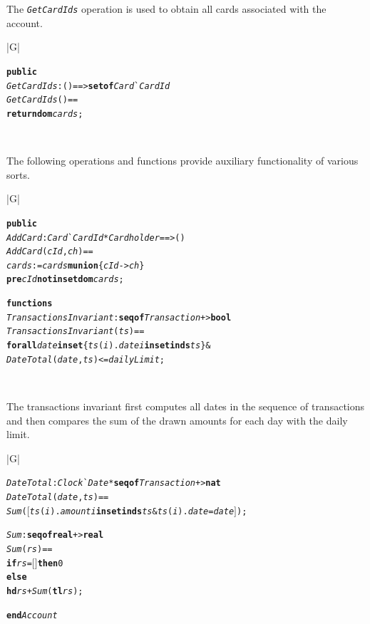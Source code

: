 \documentclass[\pformat,12pt,twoside]{article}
\newenvironment{VDMgray}%
{\begin{tabular}{|G|}\hline\small\begin{alltt}}%
{\end{alltt}\normalsize\\
 \hline\end{tabular}}
\begin{document}
The \texttt{\emph{GetCardIds}} operation is used to obtain all cards associated 
with the account.

\begin{VDMgray}
 \textbf{public}
 \textit{GetCardIds}: () ==\texttt{>} \textbf{set} \textbf{of} \textit{Card}\`{}\textit{CardId}
 \textit{GetCardIds}() ==
   \textbf{return} \textbf{dom} \textit{cards};
\end{VDMgray}


The following operations and functions provide auxiliary functionality 
of various sorts.

\begin{VDMgray}
 \textbf{public}
 \textit{AddCard} : \textit{Card}\`{}\textit{CardId} * \textit{Cardholder} ==\texttt{>} ()
 \textit{AddCard}(\textit{cId},\textit{ch}) ==
   {\color{color16} \textit{cards}} {\color{color16} :=} {\color{color16} \textit{cards}} {\color{color16} \textbf{munion}}{\color{color16} \{}{\color{color16} \textit{cId}} {\color{color16} {\textbar}-\texttt{>}} {\color{color16} \textit{ch}}{\color{color16} \}}
 \textbf{pre} {\color{color16} \textit{cId}} {\color{color16} \textbf{not in set}} {\color{color16} \textbf{dom}} {\color{color16} \textit{cards}};

\textbf{functions}
 \textit{TransactionsInvariant}: \textbf{seq} \textbf{of} \textit{Transaction} +\texttt{>} \textbf{bool}
 \textit{TransactionsInvariant}(\textit{ts}) ==
   \textbf{forall} \textit{date} \textbf{in set} \{\textit{ts}(\textit{i}).\textit{date} {\textbar} \textit{i} \textbf{in set} \textbf{inds} \textit{ts}\} \&
          \textit{DateTotal}(\textit{date},\textit{ts}) \texttt{<}= \textit{dailyLimit};
\end{VDMgray}


The transactions invariant first computes all dates in the sequence 
of transactions and then compares the sum of the drawn amounts 
for each day with the daily limit.

\begin{VDMgray}
 \textit{DateTotal} : \textit{Clock}\`{}\textit{Date} * \textbf{seq} \textbf{of} \textit{Transaction} +\texttt{>} \textbf{nat}
 \textit{DateTotal}(\textit{date},\textit{ts}) ==
 \textit{Sum}(\ensuremath{[}\textit{ts}(\textit{i}).\textit{amount} {\textbar} \textit{i} \textbf{in set} \textbf{inds} \textit{ts} \& \textit{ts}(\textit{i}).\textit{date} = \textit{date}\ensuremath{]});

 \textit{Sum}: \textbf{seq} \textbf{of} \textbf{real} +\texttt{>} \textbf{real}
 \textit{Sum}(\textit{rs}) ==
   \textbf{if} \textit{rs} = \ensuremath{[}\ensuremath{]} \textbf{then} 0
   \textbf{else}
     \textbf{hd} \textit{rs} + \textit{Sum}(\textbf{tl} \textit{rs});

\textbf{end} \textit{Account}
\end{VDMgray}
\end{document}
